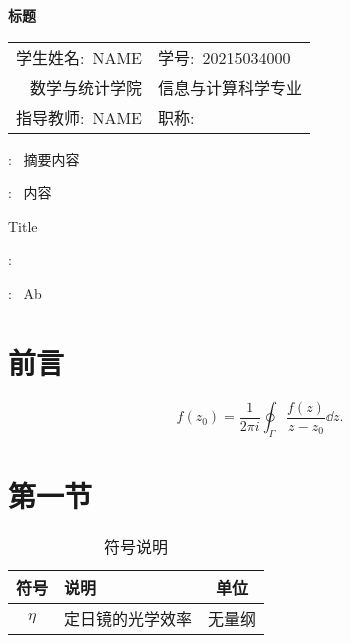 \documentclass[UTF8,heading=true,12pt,font=songti]{article}
\begin{document}
    
    \newpage
    \tableofcontents%
    \setcounter{page}{0}%
    \thispagestyle{empty}%
    \newpage
    \begin{center}
    \songti {}\bfseries 标题
	\end{center}

    \begin{table}[H]
        \vspace{-1.5em}
        \centering
        \begin{spacing}{1.5}
        \songti {}
        \begin{tabular}{rl} %
            学生姓名:\ NAME & 学号:\ 20215034000\\ 
            数学与统计学院 & 信息与计算科学专业\\
            指导教师:\ NAME & 职称:\ \\	
        \end{tabular}
        \end{spacing}
        \vspace{-1.5em}
    \end{table}
	
    : \kaishu{} \ 摘要内容 %


    :\kaishu{} \ 内容 %
    
    \begin{center}
    	 Title
    \end{center}
    :\  \lipsum[1]
    
    :\  Ab
    
    \section{前言}
    \songti
	$$
    f(z_0)=\frac{1}{2\pi i}\oint_{\Gamma}\frac{f(z)}{z-z_0}\dd z.
    $$

    \section{第一节}
    \lipsum[3]
    \begin{table}[H]
        \centering
        \caption{符号说明}
        \begin{tabular}{clc} %
            \hline
            \textbf{符号} & \textbf{说明} & \textbf{单位} \\ \hline
            $\eta$ & 定日镜的光学效率 & 无量纲\\	
            \hline
        \end{tabular}
    \end{table}
\end{document}
